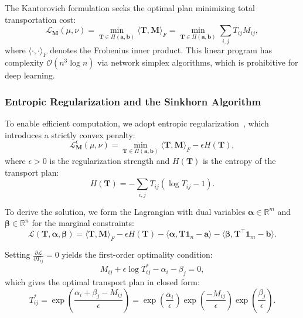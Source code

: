 \documentclass[preprint,12pt]{elsarticle}
\begin{document}
The Kantorovich formulation seeks the optimal plan minimizing total transportation cost:
\begin{equation}
    \mathcal{L}_{\mathbf{M}}(\mu, \nu) = \min_{\mathbf{T} \in \Pi(\mathbf{a}, \mathbf{b})} \langle \mathbf{T}, \mathbf{M} \rangle_F = \min_{\mathbf{T} \in \Pi(\mathbf{a}, \mathbf{b})} \sum_{i,j} T_{ij} M_{ij},
\end{equation}
where $\langle \cdot, \cdot \rangle_F$ denotes the Frobenius inner product. This linear program has complexity $\mathcal{O}(n^3 \log n)$ via network simplex algorithms, which is prohibitive for deep learning.

\subsubsection{Entropic Regularization and the Sinkhorn Algorithm}

To enable efficient computation, we adopt entropic regularization~\citep{cuturi2013sinkhorn}, which introduces a strictly convex penalty:
\begin{equation}
    \label{eq:entropic_ot}
    \mathcal{L}^\epsilon_{\mathbf{M}}(\mu, \nu) = \min_{\mathbf{T} \in \Pi(\mathbf{a}, \mathbf{b})} \langle \mathbf{T}, \mathbf{M} \rangle_F - \epsilon H(\mathbf{T}),
\end{equation}
where $\epsilon > 0$ is the regularization strength and $H(\mathbf{T})$ is the entropy of the transport plan:
\begin{equation}
    H(\mathbf{T}) = -\sum_{i,j} T_{ij}(\log T_{ij} - 1).
\end{equation}

To derive the solution, we form the Lagrangian with dual variables $\boldsymbol{\alpha} \in \mathbb{R}^m$ and $\boldsymbol{\beta} \in \mathbb{R}^n$ for the marginal constraints:
\begin{equation}
    \mathcal{L}(\mathbf{T}, \boldsymbol{\alpha}, \boldsymbol{\beta}) = \langle \mathbf{T}, \mathbf{M} \rangle_F - \epsilon H(\mathbf{T}) - \langle \boldsymbol{\alpha}, \mathbf{T}\mathbf{1}_n - \mathbf{a} \rangle - \langle \boldsymbol{\beta}, \mathbf{T}^\top\mathbf{1}_m - \mathbf{b} \rangle.
\end{equation}

Setting $\frac{\partial \mathcal{L}}{\partial T_{ij}} = 0$ yields the first-order optimality condition:
\begin{equation}
    M_{ij} + \epsilon \log T^*_{ij} - \alpha_i - \beta_j = 0,
\end{equation}
which gives the optimal transport plan in closed form:
\begin{equation}
    \label{eq:optimal_plan_form}
    T^*_{ij} = \exp\left(\frac{\alpha_i + \beta_j - M_{ij}}{\epsilon}\right) = \exp\left(\frac{\alpha_i}{\epsilon}\right) \exp\left(\frac{-M_{ij}}{\epsilon}\right) \exp\left(\frac{\beta_j}{\epsilon}\right).
\end{equation}
\end{document}
